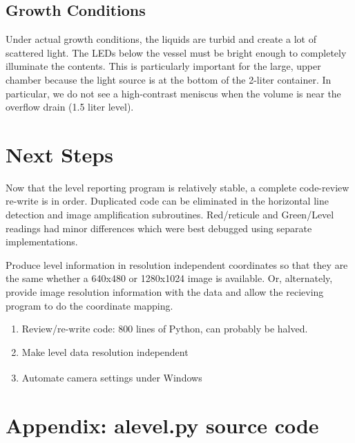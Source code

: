 \documentclass[10pt,letterpaper]{article}
\begin{document}
\subsection*{Growth Conditions}
Under actual growth conditions, the liquids are turbid and create a lot of scattered light.  The LEDs below the vessel must be bright enough to completely illuminate the contents.  This is particularly important for the large, upper chamber because the light source is at the bottom of the 2-liter container. In particular, we do not see a high-contrast meniscus when the volume is near the overflow drain (1.5 liter level).

\section*{Next Steps}

Now that the level reporting program is relatively stable, a complete code-review re-write is in order.  Duplicated code can be eliminated in the horizontal line detection and image amplification subroutines. Red/reticule and Green/Level readings had minor differences which were best debugged using separate implementations.

Produce level information in resolution independent coordinates so that they are the same whether a 640x480 or 1280x1024 image is available. Or, alternately, provide image resolution information with the data and allow the recieving program to do the coordinate mapping.

\begin{enumerate}[itemsep=1pt, topsep=2pt, partopsep=0pt]
\item Review/re-write code: 800 lines of Python, can probably be halved.
\item Make level data resolution independent
\item Automate camera settings under Windows\textsuperscript{\textregistered}
\end{enumerate}


{}

\pagebreak

\section{Appendix: alevel.py source code}
\newcommand*{\SrcPath}{../..}

\end{document}
